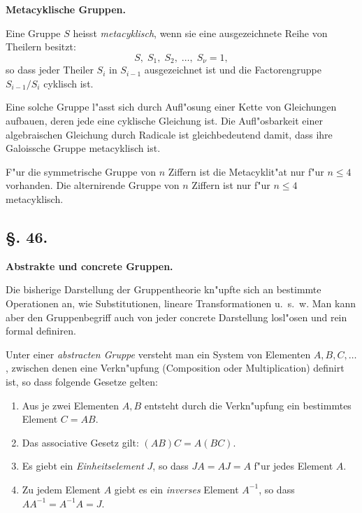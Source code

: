\documentclass[12pt,a4paper]{article}
\theoremstyle{weber}
\begin{document}
\begin{center}
\textbf{Metacyklische Gruppen.}
\end{center}

\bigskip

Eine Gruppe $S$ heisst \textit{metacyklisch}, wenn sie eine ausgezeichnete Reihe von Theilern besitzt:
\begin{equation}\label{eq:1}
S,\; S_1,\; S_2,\; \ldots,\; S_\nu = 1,
\end{equation}
so dass jeder Theiler $S_i$ in $S_{i-1}$ ausgezeichnet ist und die Factorengruppe $S_{i-1}/S_i$ cyklisch ist.

Eine solche Gruppe l"asst sich durch Aufl"osung einer Kette von Gleichungen aufbauen, deren jede eine cyklische Gleichung ist. Die Aufl"osbarkeit einer algebraischen Gleichung durch Radicale ist gleichbedeutend damit, dass ihre Galoissche Gruppe metacyklisch ist.

F"ur die symmetrische Gruppe von $n$ Ziffern ist die Metacyklit"at nur f"ur $n \leq 4$ vorhanden. Die alternirende Gruppe von $n$ Ziffern ist nur f"ur $n \leq 4$ metacyklisch.

\newpage
\subsection*{\S. 46.}

\begin{center}
\textbf{Abstrakte und concrete Gruppen.}
\end{center}

\bigskip

Die bisherige Darstellung der Gruppentheorie kn"upfte sich an bestimmte Operationen an, wie Substitutionen, lineare Transformationen u.~s.~w. Man kann aber den Gruppenbegriff auch von jeder concrete Darstellung losl"osen und rein formal definiren.

Unter einer \textit{abstracten Gruppe} versteht man ein System von Elementen $A, B, C, \ldots$, zwischen denen eine Verkn"upfung (Composition oder Multiplication) definirt ist, so dass folgende Gesetze gelten:

\begin{enumerate}[label=\arabic*.]
\item Aus je zwei Elementen $A, B$ entsteht durch die Verkn"upfung ein bestimmtes Element $C = AB$.
\item Das associative Gesetz gilt: $(AB)C = A(BC)$.
\item Es giebt ein \textit{Einheitselement} $J$, so dass $JA = AJ = A$ f"ur jedes Element $A$.
\item Zu jedem Element $A$ giebt es ein \textit{inverses} Element $A^{-1}$, so dass $AA^{-1} = A^{-1}A = J$.
\end{enumerate}
\end{document}
